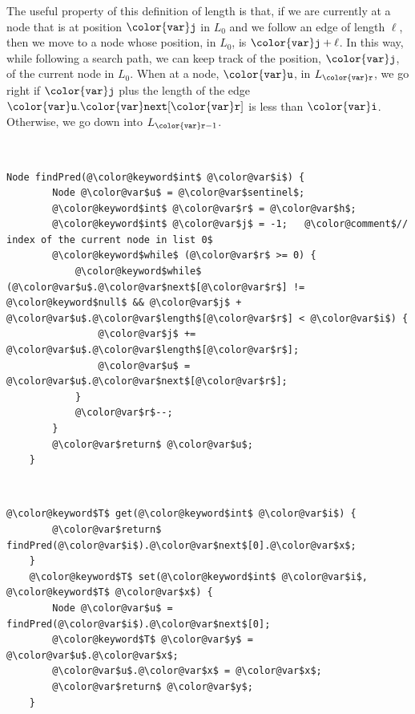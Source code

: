 \documentclass[10pt]{book}
\theoremstyle{plain}
\theoremstyle{definition}
\begin{document}
The useful property of this definition of length is that, if we are
currently at a node that is at position \ensuremath{\mathtt{{\color{var}j}}} in $L_0$ and we follow an
edge of length $\ell$, then we move to a node whose position, in $L_0$,
is $\ensuremath{\mathtt{{\color{var}j}}}+\ell$.  In this way, while following a search path, we can keep
track of the position, \ensuremath{\mathtt{{\color{var}j}}}, of the current node in $L_0$.  When at a
node, \ensuremath{\mathtt{{\color{var}u}}}, in $L_{\ensuremath{\mathtt{{\color{var}r}}}}$, we go right if \ensuremath{\mathtt{{\color{var}j}}} plus the length of the edge
\ensuremath{\mathtt{{\color{var}u}.{\color{var}next}[{\color{var}r}]}} is less than \ensuremath{\mathtt{{\color{var}i}}}. Otherwise, we go down into $L_{\ensuremath{\mathtt{{\color{var}r}}}-1}$.



 \ \vspace{.5ex}\begin{Verbatim}[gobble=1,tabsize=2,frame=single,framerule=1.2pt,commandchars=\\@\$,label=\texttt{SkiplistList},labelposition=topline]
	Node findPred(@\color@keyword$int$ @\color@var$i$) {
		Node @\color@var$u$ = @\color@var$sentinel$;
		@\color@keyword$int$ @\color@var$r$ = @\color@var$h$;
		@\color@keyword$int$ @\color@var$j$ = -1;   @\color@comment$// index of the current node in list 0$
		@\color@keyword$while$ (@\color@var$r$ >= 0) {
			@\color@keyword$while$ (@\color@var$u$.@\color@var$next$[@\color@var$r$] != @\color@keyword$null$ && @\color@var$j$ + @\color@var$u$.@\color@var$length$[@\color@var$r$] < @\color@var$i$) {
				@\color@var$j$ += @\color@var$u$.@\color@var$length$[@\color@var$r$];
				@\color@var$u$ = @\color@var$u$.@\color@var$next$[@\color@var$r$];
			}
			@\color@var$r$--;
		}
		@\color@var$return$ @\color@var$u$;
	}
\end{Verbatim}



 \ \vspace{.5ex}\begin{Verbatim}[gobble=1,tabsize=2,frame=single,framerule=1.2pt,commandchars=\\@\$,label=\texttt{SkiplistList},labelposition=topline]
	@\color@keyword$T$ get(@\color@keyword$int$ @\color@var$i$) {
		@\color@var$return$ findPred(@\color@var$i$).@\color@var$next$[0].@\color@var$x$;
	}
	@\color@keyword$T$ set(@\color@keyword$int$ @\color@var$i$, @\color@keyword$T$ @\color@var$x$) {
		Node @\color@var$u$ = findPred(@\color@var$i$).@\color@var$next$[0];
		@\color@keyword$T$ @\color@var$y$ = @\color@var$u$.@\color@var$x$;
		@\color@var$u$.@\color@var$x$ = @\color@var$x$;
		@\color@var$return$ @\color@var$y$;
	}
\end{Verbatim}
\end{document}
